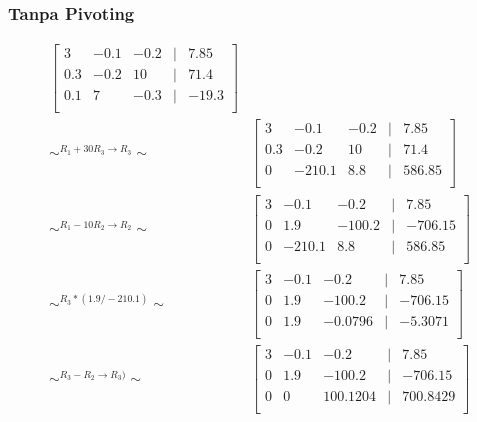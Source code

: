 \documentclass{beamer}
\begin{document}
\begin{frame}
\frametitle{Tanpa Pivoting}
\begin{small}
\begin{equation}
\begin{split}
\begin{bmatrix}
	3 & -0.1 & -0.2 & | & 7.85\\
	0.3 & -0.2 & 10 & | & 71.4\\
	0.1 & 7 & -0.3 & | & -19.3\\
	\end{bmatrix}&\\ \sim^{R_1+30R_3 \rightarrow R_3}\sim 
&\begin{bmatrix}
	3 & -0.1 & -0.2 & | & 7.85\\
	0.3 & -0.2 & 10 & | & 71.4\\
	0 & -210.1 & 8.8 & | & 586.85\\
\end{bmatrix}
\\\sim^{R_1-10R_2 \rightarrow R_2}\sim 
&\begin{bmatrix}
	3 & -0.1 & -0.2 & | & 7.85\\
	0 & 1.9 & -100.2 & | & -706.15\\
	0 & -210.1 & 8.8 & | & 586.85\\
\end{bmatrix}
\\\sim^{R_3*(1.9/-210.1)}\sim 
&\begin{bmatrix}
	3 & -0.1 & -0.2 & | & 7.85\\
	0 & 1.9 & -100.2 & | & -706.15\\
	0 & 1.9 & -0.0796 & | & -5.3071\\
\end{bmatrix}
\\\sim^{R_3-R_2 \rightarrow R_3)}\sim 
&\begin{bmatrix}
	3 & -0.1 & -0.2 & | & 7.85\\
	0 & 1.9 & -100.2 & | & -706.15\\
	0 & 0 & 100.1204 & | & 700.8429\\
\end{bmatrix}
\end{split}
\nonumber
\end{equation}
\end{small}
\end{frame}
\end{document}
